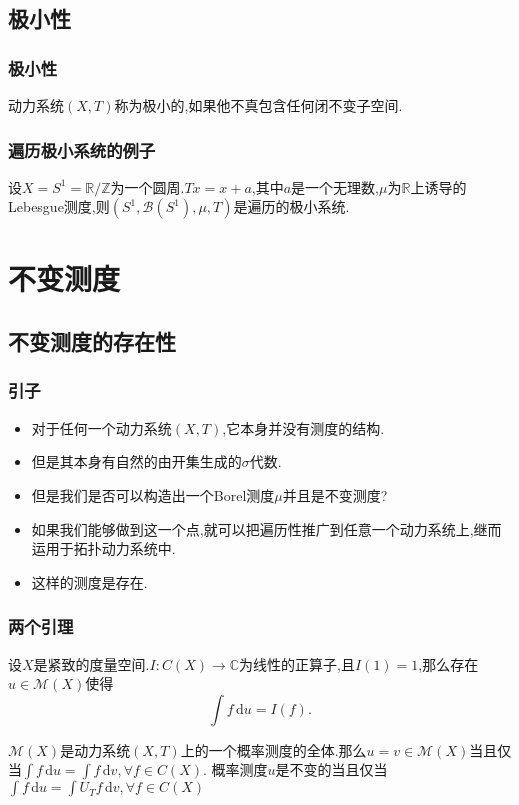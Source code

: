 \documentclass[compress,red]{beamer}
\begin{document}
\subsection{极小性}
\begin{frame}
\frametitle{极小性}
\begin{definition}
动力系统$(X,T)$称为极小的,如果他不真包含任何闭不变子空间.

\end{definition}
\end{frame}

\begin{frame}
\frametitle{遍历极小系统的例子}
\begin{example}[$S^1$的无理旋转]
设$X=S^1=\mathbb{R}/\mathbb{Z}$为一个圆周.$Tx=x+a$,其中$a$是一个无理数,$\mu$为$\mathbb{R}$上诱导的Lebesgue测度,则$(S^1,\mathscr{B}(S^1),\mu,T)$是遍历的极小系统.
\end{example}
\end{frame}





\section{不变测度}
\subsection{不变测度的存在性}
\begin{frame}
\frametitle{引子}
\begin{itemize}
\item<1-> 对于任何一个动力系统$(X,T)$,它本身并没有测度的结构.
\item<2-> 但是其本身有自然的由开集生成的$\sigma$代数.
\item<3-> 但是我们是否可以构造出一个Borel测度$\mu$并且是不变测度?
\item<4-> 如果我们能够做到这一个点,就可以把遍历性推广到任意一个动力系统上,继而运用于拓扑动力系统中.
\item<5-> 这样的测度是存在.

\end{itemize}

\end{frame}

\begin{frame}
\frametitle{两个引理}
\begin{theorem}

设$X$是紧致的度量空间.$I:C(X)\rightarrow \mathbb{C}$为线性的正算子,且$I(1)=1$,那么存在$u\in \mathcal{M}(X)$使得$$\int \!f\,\mathrm{d}u=I(f).$$

\end{theorem}
\begin{lemma}
\label{l}
$\mathcal{M}(X)$是动力系统$(X,T)$上的一个概率测度的全体.那么$u=v\in \mathcal{M}(X)$当且仅当$\int\!f \, \mathrm{d}u=\int f\, \mathrm{d}v,\forall f\in C(X)$.
概率测度$u$是不变的当且仅当$\int\!f \, \mathrm{d}u=\int\! U_Tf\, \mathrm{d}v,\forall f\in C(X)$
\end{lemma}
\end{frame}
\end{document}
